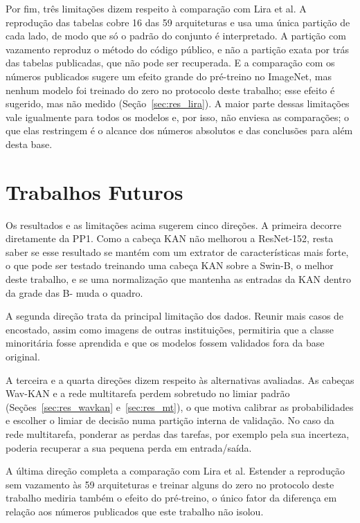 Por fim, três limitações dizem respeito à comparação com Lira et al. A reprodução das tabelas cobre 16 das 59 arquiteturas e usa uma única partição de cada lado, de modo que só o padrão do conjunto é interpretado. A partição com vazamento reproduz o método do código público, e não a partição exata por trás das tabelas publicadas, que não pode ser recuperada. E a comparação com os números publicados sugere um efeito grande do pré-treino no ImageNet, mas nenhum modelo foi treinado do zero no protocolo deste trabalho; esse efeito é sugerido, mas não medido (Seção~\ref{sec:res_lira}). A maior parte dessas limitações vale igualmente para todos os modelos e, por isso, não enviesa as comparações; o que elas restringem é o alcance dos números absolutos e das conclusões para além desta base.

\section{Trabalhos Futuros}
\label{sec:future}

Os resultados e as limitações acima sugerem cinco direções. A primeira decorre diretamente da PP1. Como a cabeça KAN não melhorou a ResNet-152, resta saber se esse resultado se mantém com um extrator de características mais forte, o que pode ser testado treinando uma cabeça KAN sobre a Swin-B, o melhor  deste trabalho, e se uma normalização que mantenha as entradas da KAN dentro da grade das B- muda o quadro.

A segunda direção trata da principal limitação dos dados. Reunir mais casos de encostado, assim como imagens de outras instituições, permitiria que a classe minoritária fosse aprendida e que os modelos fossem validados fora da base original.

A terceira e a quarta direções dizem respeito às alternativas avaliadas. As cabeças Wav-KAN e a rede multitarefa perdem sobretudo no limiar padrão (Seções~\ref{sec:res_wavkan} e~\ref{sec:res_mt}), o que motiva calibrar as probabilidades e escolher o limiar de decisão numa partição interna de validação. No caso da rede multitarefa, ponderar as perdas das tarefas, por exemplo pela sua incerteza, poderia recuperar a sua pequena perda em entrada/saída.

A última direção completa a comparação com Lira et al. Estender a reprodução sem vazamento às 59 arquiteturas e treinar alguns  do zero no protocolo deste trabalho mediria também o efeito do pré-treino, o único fator da diferença em relação aos números publicados que este trabalho não isolou.
